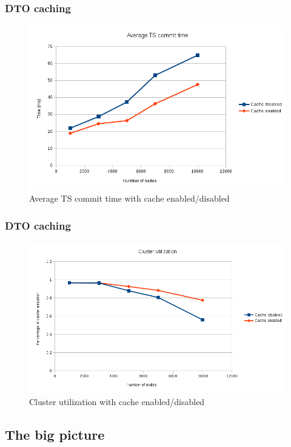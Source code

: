 \documentclass{beamer}
\begin{document}
\begin{frame}
\frametitle{DTO caching}

\begin{figure}
\centering
\includegraphics[scale=0.5]{resources/avg_commit_cache_en_di.png}
\caption{Average TS commit time with cache enabled/disabled}
\end{figure}
\end{frame}

\begin{frame}
\frametitle{DTO caching}

\begin{figure}
\centering
\includegraphics[scale=0.48]{resources/cluster_util_cache_en_di.png}
\caption{Cluster utilization with cache enabled/disabled}
\end{figure}
\end{frame}

\subsection{The big picture}
\end{document}

